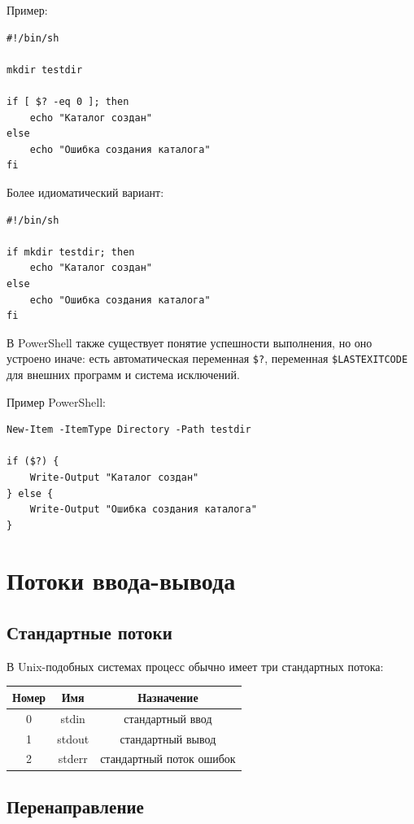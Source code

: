 \documentclass[12pt,a4paper]{article}
\begin{document}
Пример:

\begin{lstlisting}
#!/bin/sh

mkdir testdir

if [ $? -eq 0 ]; then
    echo "Каталог создан"
else
    echo "Ошибка создания каталога"
fi
\end{lstlisting}

Более идиоматический вариант:

\begin{lstlisting}
#!/bin/sh

if mkdir testdir; then
    echo "Каталог создан"
else
    echo "Ошибка создания каталога"
fi
\end{lstlisting}

В PowerShell также существует понятие успешности выполнения, но оно устроено иначе: есть автоматическая переменная \texttt{\$?}, переменная \texttt{\$LASTEXITCODE} для внешних программ и система исключений.

Пример PowerShell:

\begin{lstlisting}
New-Item -ItemType Directory -Path testdir

if ($?) {
    Write-Output "Каталог создан"
} else {
    Write-Output "Ошибка создания каталога"
}
\end{lstlisting}

\section{Потоки ввода-вывода}

\subsection{Стандартные потоки}

В Unix-подобных системах процесс обычно имеет три стандартных потока:

\begin{center}
\begin{tabular}{|c|c|c|}
\hline
Номер & Имя & Назначение \\
\hline
0 & stdin & стандартный ввод \\
1 & stdout & стандартный вывод \\
2 & stderr & стандартный поток ошибок \\
\hline
\end{tabular}
\end{center}

\subsection{Перенаправление}
\end{document}
